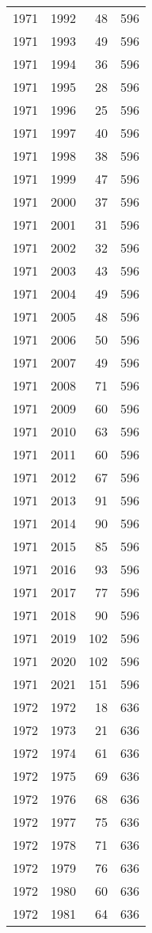 \documentclass[
  10pt,
  letterpaper,
  DIV=11,
  numbers=noendperiod,
  twoside]{scrartcl}
\begin{document}
\begin{longtable}[]{@{}rrrr@{}}
1971 & 1992 & 48 & 596 \\
1971 & 1993 & 49 & 596 \\
1971 & 1994 & 36 & 596 \\
1971 & 1995 & 28 & 596 \\
1971 & 1996 & 25 & 596 \\
1971 & 1997 & 40 & 596 \\
1971 & 1998 & 38 & 596 \\
1971 & 1999 & 47 & 596 \\
1971 & 2000 & 37 & 596 \\
1971 & 2001 & 31 & 596 \\
1971 & 2002 & 32 & 596 \\
1971 & 2003 & 43 & 596 \\
1971 & 2004 & 49 & 596 \\
1971 & 2005 & 48 & 596 \\
1971 & 2006 & 50 & 596 \\
1971 & 2007 & 49 & 596 \\
1971 & 2008 & 71 & 596 \\
1971 & 2009 & 60 & 596 \\
1971 & 2010 & 63 & 596 \\
1971 & 2011 & 60 & 596 \\
1971 & 2012 & 67 & 596 \\
1971 & 2013 & 91 & 596 \\
1971 & 2014 & 90 & 596 \\
1971 & 2015 & 85 & 596 \\
1971 & 2016 & 93 & 596 \\
1971 & 2017 & 77 & 596 \\
1971 & 2018 & 90 & 596 \\
1971 & 2019 & 102 & 596 \\
1971 & 2020 & 102 & 596 \\
1971 & 2021 & 151 & 596 \\
1972 & 1972 & 18 & 636 \\
1972 & 1973 & 21 & 636 \\
1972 & 1974 & 61 & 636 \\
1972 & 1975 & 69 & 636 \\
1972 & 1976 & 68 & 636 \\
1972 & 1977 & 75 & 636 \\
1972 & 1978 & 71 & 636 \\
1972 & 1979 & 76 & 636 \\
1972 & 1980 & 60 & 636 \\
1972 & 1981 & 64 & 636 \\

\end{longtable}
\end{document}
